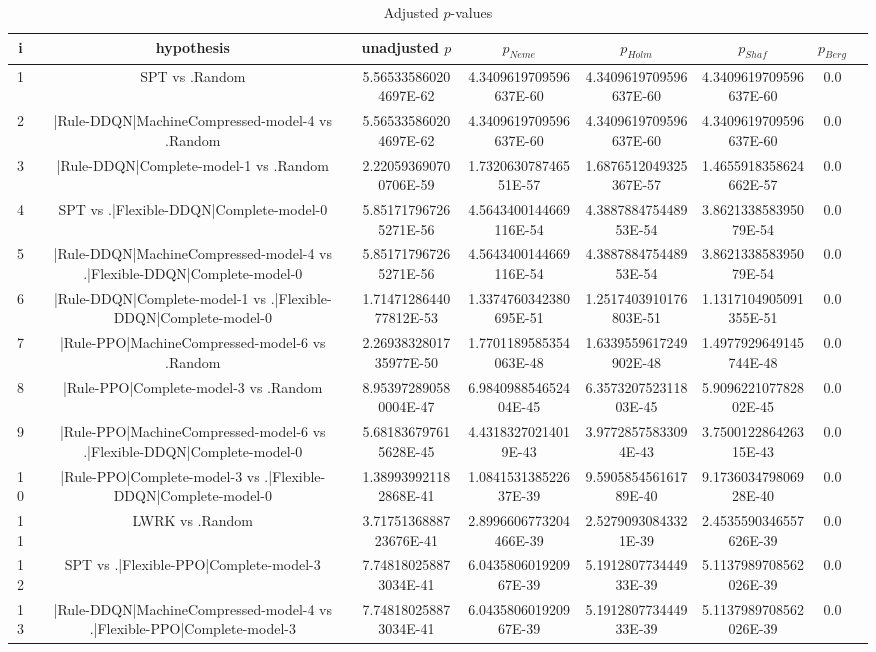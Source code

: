 \documentclass[a3paper,10pt]{article}
\begin{document}
\begin{table}[!htp]
\centering\tiny
\caption{Adjusted $p$-values}
\begin{tabular}{cccccccc}
i&hypothesis&unadjusted $p$&$p_{Neme}$&$p_{Holm}$&$p_{Shaf}$&$p_{Berg}$\\
\hline
1&SPT vs .Random&5.565335860204697E-62&4.3409619709596637E-60&4.3409619709596637E-60&4.3409619709596637E-60&0.0\\
2&|Rule-DDQN|MachineCompressed-model-4 vs .Random&5.565335860204697E-62&4.3409619709596637E-60&4.3409619709596637E-60&4.3409619709596637E-60&0.0\\
3&|Rule-DDQN|Complete-model-1 vs .Random&2.220593690700706E-59&1.732063078746551E-57&1.6876512049325367E-57&1.4655918358624662E-57&0.0\\
4&SPT vs .|Flexible-DDQN|Complete-model-0&5.851717967265271E-56&4.5643400144669116E-54&4.388788475448953E-54&3.862133858395079E-54&0.0\\
5&|Rule-DDQN|MachineCompressed-model-4 vs .|Flexible-DDQN|Complete-model-0&5.851717967265271E-56&4.5643400144669116E-54&4.388788475448953E-54&3.862133858395079E-54&0.0\\
6&|Rule-DDQN|Complete-model-1 vs .|Flexible-DDQN|Complete-model-0&1.7147128644077812E-53&1.3374760342380695E-51&1.2517403910176803E-51&1.1317104905091355E-51&0.0\\
7&|Rule-PPO|MachineCompressed-model-6 vs .Random&2.2693832801735977E-50&1.7701189585354063E-48&1.6339559617249902E-48&1.4977929649145744E-48&0.0\\
8&|Rule-PPO|Complete-model-3 vs .Random&8.953972890580004E-47&6.984098854652404E-45&6.357320752311803E-45&5.909622107782802E-45&0.0\\
9&|Rule-PPO|MachineCompressed-model-6 vs .|Flexible-DDQN|Complete-model-0&5.681836797615628E-45&4.43183270214019E-43&3.97728575833094E-43&3.750012286426315E-43&0.0\\
10&|Rule-PPO|Complete-model-3 vs .|Flexible-DDQN|Complete-model-0&1.389939921182868E-41&1.084153138522637E-39&9.590585456161789E-40&9.173603479806928E-40&0.0\\
11&LWRK vs .Random&3.7175136888723676E-41&2.8996606773204466E-39&2.52790930843321E-39&2.4535590346557626E-39&0.0\\
12&SPT vs .|Flexible-PPO|Complete-model-3&7.748180258873034E-41&6.043580601920967E-39&5.191280773444933E-39&5.1137989708562026E-39&0.0\\
13&|Rule-DDQN|MachineCompressed-model-4 vs .|Flexible-PPO|Complete-model-3&7.748180258873034E-41&6.043580601920967E-39&5.191280773444933E-39&5.1137989708562026E-39&0.0\\

\end{tabular}
\end{table}
\end{document}
